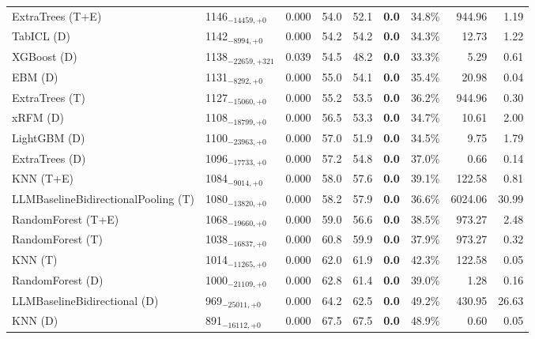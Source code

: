 \begin{tabular}{llcccccrr}
ExtraTrees (T+E) & 1146${}_{-14459,+0}$ & 0.000 & 54.0 & 52.1 & \textcolor{bronze}{\textbf{0.0}} & 34.8\% & 944.96 & 1.19 \\
TabICL (D) & 1142${}_{-8994,+0}$ & 0.000 & 54.2 & 54.2 & \textcolor{bronze}{\textbf{0.0}} & 34.3\% & 12.73 & 1.22 \\
XGBoost (D) & 1138${}_{-22659,+321}$ & 0.039 & 54.5 & 48.2 & \textcolor{bronze}{\textbf{0.0}} & 33.3\% & 5.29 & 0.61 \\
EBM (D) & 1131${}_{-8292,+0}$ & 0.000 & 55.0 & 54.1 & \textcolor{bronze}{\textbf{0.0}} & 35.4\% & 20.98 & 0.04 \\
ExtraTrees (T) & 1127${}_{-15060,+0}$ & 0.000 & 55.2 & 53.5 & \textcolor{bronze}{\textbf{0.0}} & 36.2\% & 944.96 & 0.30 \\
xRFM (D) & 1108${}_{-18799,+0}$ & 0.000 & 56.5 & 53.3 & \textcolor{bronze}{\textbf{0.0}} & 34.7\% & 10.61 & 2.00 \\
LightGBM (D) & 1100${}_{-23963,+0}$ & 0.000 & 57.0 & 51.9 & \textcolor{bronze}{\textbf{0.0}} & 34.5\% & 9.75 & 1.79 \\
ExtraTrees (D) & 1096${}_{-17733,+0}$ & 0.000 & 57.2 & 54.8 & \textcolor{bronze}{\textbf{0.0}} & 37.0\% & 0.66 & 0.14 \\
KNN (T+E) & 1084${}_{-9014,+0}$ & 0.000 & 58.0 & 57.6 & \textcolor{bronze}{\textbf{0.0}} & 39.1\% & 122.58 & 0.81 \\
LLMBaselineBidirectionalPooling (T) & 1080${}_{-13820,+0}$ & 0.000 & 58.2 & 57.9 & \textcolor{bronze}{\textbf{0.0}} & 36.6\% & 6024.06 & 30.99 \\
RandomForest (T+E) & 1068${}_{-19660,+0}$ & 0.000 & 59.0 & 56.6 & \textcolor{bronze}{\textbf{0.0}} & 38.5\% & 973.27 & 2.48 \\
RandomForest (T) & 1038${}_{-16837,+0}$ & 0.000 & 60.8 & 59.9 & \textcolor{bronze}{\textbf{0.0}} & 37.9\% & 973.27 & 0.32 \\
KNN (T) & 1014${}_{-11265,+0}$ & 0.000 & 62.0 & 61.9 & \textcolor{bronze}{\textbf{0.0}} & 42.3\% & 122.58 & 0.05 \\
RandomForest (D) & 1000${}_{-21109,+0}$ & 0.000 & 62.8 & 61.4 & \textcolor{bronze}{\textbf{0.0}} & 39.0\% & 1.28 & 0.16 \\
LLMBaselineBidirectional (D) & 969${}_{-25011,+0}$ & 0.000 & 64.2 & 62.5 & \textcolor{bronze}{\textbf{0.0}} & 49.2\% & 430.95 & 26.63 \\
KNN (D) & 891${}_{-16112,+0}$ & 0.000 & 67.5 & 67.5 & \textcolor{bronze}{\textbf{0.0}} & 48.9\% & 0.60 & 0.05 \\
\bottomrule
\end{tabular}
